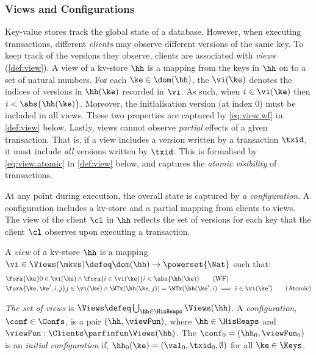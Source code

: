 \subsubsection{Views and Configurations}

Key-value stores track the global state of a database. 
However, when executing transactions,
different \emph{clients} may observe different versions of the same key. 
To keep track of the versions they observe,
clients are associated with \emph{views} (\cref{def:view}). 
A view of a kv-store $\hh$ is a mapping from the keys in $\hh$ on to a set of natural numbers. 
For each $\ke \in \dom(\hh)$, the $\vi(\ke)$ denotes the indices of versions in $\hh(\ke)$ recorded in $\vi$. 
As such, when $i \in \vi(\ke)$ then $ i < \abs{ \hh(\ke) }$. 
Moreover, the initialisation version (at index $0$) must be included in all views. 
These two properties are captured by \eqref{eq:view.wf} in \cref{def:view} below. 
Lastly, views cannot observe \emph{partial} effects of a given transaction. 
That is, if a view includes a version written by a transaction $\txid$, it must include \emph{all} versions written by $\txid$. 
This is formalised by \eqref{eq:view.atomic} in \cref{def:view} below, and captures the \emph{atomic visibility} of transactions. 


At any point during execution, the overall state is captured by \emph{a configuration}. 
A configuration includes a kv-store and a partial mapping from clients to views.
The view of the client $\cl$ in $\hh$ reflects the set of versions for each key 
that the client \(\cl \) observes upon executing a transaction. 


\begin{definition}
\label{def:view}
\label{def:cuts}
\label{def:views}
\label{def:configuration}
A \emph{view} of a kv-store $\hh$ is a mapping  
$\vi \in \Views(\mkvs) \defeq \dom(\hh) \to\powerset{\Nat}$ such that:
\begin{align}
    & \fora{ \ke } 
    0 \in \vi(\ke) 
    \wedge \fora{ i \in \vi(\ke) } 
    i < \abs{ \hh(\ke) } 
    \tag{WF}
    \label{eq:view.wf}\\
    & 
    \fora{ \ke,\ke', i,j} 
	j \in \vi(\ke) 
	\land \WTx(\hh(\ke, j)) = \WTx(\hh(\ke', i) 
	\implies i \in \vi(\ke')
	\tag{Atomic}
	\label{eq:view.atomic}
\end{align}

\emph{The set of views} is
$
\Views \defeq \bigcup_{\hh \in \HisHeaps} \Views(\hh)
$.
A \emph{configuration}, $\conf \in \Confs$, is a pair $(\hh, \viewFun)$, 
where $\hh \in \HisHeaps$ and
$\viewFun : \Clients \parfinfun \Views(\hh)$. 
The $\conf_{0} = (\hh_{0}, \viewFun_{0})$ is an
\emph{initial configuration} if, $\hh_{0}(\ke) = (\val_0, \txid_0, \emptyset)$ for all $\ke \in \Keys$.
\end{definition}



